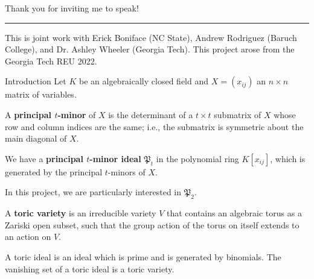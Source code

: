 \documentclass[mathserif
    , handout
   ]{beamer}
\title
{\color{GTblue}{Toric varieties given by principal 2-minor ideals}}
\subtitle{Undergraduate Mathematics Research Symposium 2023}
\author[Sai Sivakumar]
{Sai Sivakumar}
\institute[Georgia Tech]{\color{GTtechgold}{University of Florida}}
\date{28 April 2023}
\newcommand{\pr}{\mathfrak P}
\theoremstyle{plain}
\theoremstyle{definition}
\theoremstyle{remark}
\begin{document}
\frame{\titlepage}

\begin{frame}{}{}
{\color{GTtechgold}Thank you for inviting me to speak!}
\vspace{0.75pc}
\hrule
\pause
\vspace{0.75pc}
This is joint work with Erick Boniface (NC State), Andrew Rodriguez (Baruch College), and Dr. Ashley Wheeler (Georgia Tech).
\pause
This project arose from the Georgia Tech REU 2022. 
\end{frame}


\begin{frame}{Introduction}
Let $K$ be an algebraically closed field and $X=(x_{ij})$ an $n\times n$ matrix of variables.

\pause
\vspace{0.75pc} 
\begin{definition}
    A \textbf{principal $t$-minor} of $X$ is the determinant of a $t\times t$ submatrix of $X$ whose row and column indices are the same; i.e., the submatrix is symmetric about the main diagonal of $X$.
\end{definition}

\pause
\vspace{0.75pc}
We have a \textbf{principal $t$-minor ideal} $\pr_t$ in the polynomial ring $K[x_{ij}]$, which is generated by the principal $t$-minors of $X$. 
\end{frame}

\begin{frame}
In this project, we are particularly interested in $\pr_2$.

\pause
\vspace{0.75pc}
\begin{definition}
    A \textbf{toric variety} is an irreducible variety $V$ that contains an algebraic torus as a Zariski open subset, such that the group action of the torus on itself extends to an action on $V$.
\end{definition}

\pause
\vspace{0.75pc}
A toric ideal is an ideal which is prime and is generated by binomials. The vanishing set of a toric ideal is a toric variety. 

\end{frame}
\end{document}
